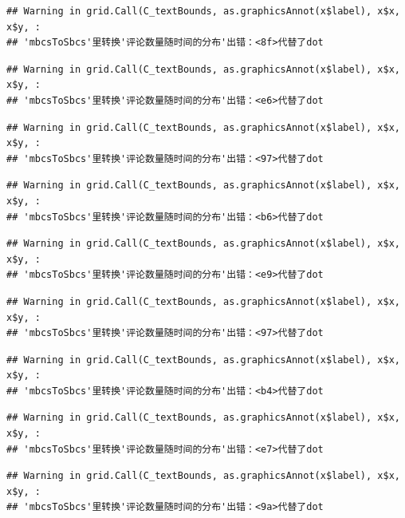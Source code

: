 \documentclass[
]{article}
\begin{document}
\begin{verbatim}
## Warning in grid.Call(C_textBounds, as.graphicsAnnot(x$label), x$x, x$y, :
## 'mbcsToSbcs'里转换'评论数量随时间的分布'出错：<8f>代替了dot
\end{verbatim}

\begin{verbatim}
## Warning in grid.Call(C_textBounds, as.graphicsAnnot(x$label), x$x, x$y, :
## 'mbcsToSbcs'里转换'评论数量随时间的分布'出错：<e6>代替了dot
\end{verbatim}

\begin{verbatim}
## Warning in grid.Call(C_textBounds, as.graphicsAnnot(x$label), x$x, x$y, :
## 'mbcsToSbcs'里转换'评论数量随时间的分布'出错：<97>代替了dot
\end{verbatim}

\begin{verbatim}
## Warning in grid.Call(C_textBounds, as.graphicsAnnot(x$label), x$x, x$y, :
## 'mbcsToSbcs'里转换'评论数量随时间的分布'出错：<b6>代替了dot
\end{verbatim}

\begin{verbatim}
## Warning in grid.Call(C_textBounds, as.graphicsAnnot(x$label), x$x, x$y, :
## 'mbcsToSbcs'里转换'评论数量随时间的分布'出错：<e9>代替了dot
\end{verbatim}

\begin{verbatim}
## Warning in grid.Call(C_textBounds, as.graphicsAnnot(x$label), x$x, x$y, :
## 'mbcsToSbcs'里转换'评论数量随时间的分布'出错：<97>代替了dot
\end{verbatim}

\begin{verbatim}
## Warning in grid.Call(C_textBounds, as.graphicsAnnot(x$label), x$x, x$y, :
## 'mbcsToSbcs'里转换'评论数量随时间的分布'出错：<b4>代替了dot
\end{verbatim}

\begin{verbatim}
## Warning in grid.Call(C_textBounds, as.graphicsAnnot(x$label), x$x, x$y, :
## 'mbcsToSbcs'里转换'评论数量随时间的分布'出错：<e7>代替了dot
\end{verbatim}

\begin{verbatim}
## Warning in grid.Call(C_textBounds, as.graphicsAnnot(x$label), x$x, x$y, :
## 'mbcsToSbcs'里转换'评论数量随时间的分布'出错：<9a>代替了dot
\end{verbatim}
\end{document}
